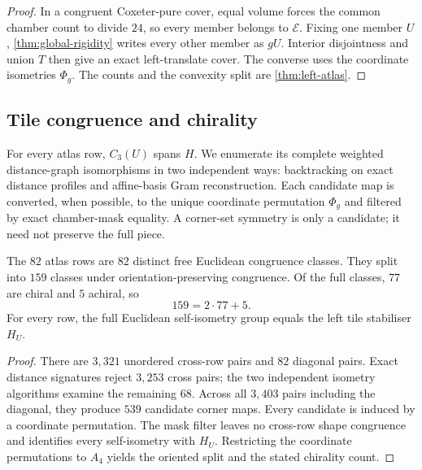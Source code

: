 \begin{proof}
In a congruent Coxeter-pure cover, equal volume forces the common chamber
count to divide $24$, so every member belongs to $\mathcal E$.  Fixing one
member $U$, \cref{thm:global-rigidity} writes every other member as $gU$.
Interior disjointness and union $T$ then give an exact left-translate cover.
The converse uses the coordinate isometries $\Phi_g$.  The counts and the
convexity split are \cref{thm:left-atlas}.
\end{proof}

\subsection{Tile congruence and chirality}

For every atlas row, $C_3(U)$ spans $H$.  We enumerate its complete weighted
distance-graph isomorphisms in two independent ways: backtracking on exact
distance profiles and affine-basis Gram reconstruction.  Each candidate map
is converted, when possible, to the unique coordinate permutation $\Phi_g$
and filtered by exact chamber-mask equality.  A corner-set symmetry is only
a candidate; it need not preserve the full piece.

\begin{theorem}\label{thm:tile-congruence}
The $82$ atlas rows are $82$ distinct free Euclidean congruence classes.
They split into $159$ classes under orientation-preserving congruence.  Of
the full classes, $77$ are chiral and $5$ achiral, so
\[
 159=2\cdot77+5.
\]
For every row, the full Euclidean self-isometry group equals the left tile
stabiliser $H_U$.
\end{theorem}
\begin{proof}
There are $3{,}321$ unordered cross-row pairs and $82$ diagonal pairs.  Exact
distance signatures reject $3{,}253$ cross pairs; the two independent
isometry algorithms examine the remaining $68$.  Across all $3{,}403$ pairs
including the diagonal, they produce $539$ candidate corner maps.  Every
candidate is induced by a coordinate permutation.  The mask filter leaves no
cross-row shape congruence and identifies every self-isometry with $H_U$.
Restricting the coordinate permutations to $A_4$ yields the oriented split
and the stated chirality count.
\end{proof}

